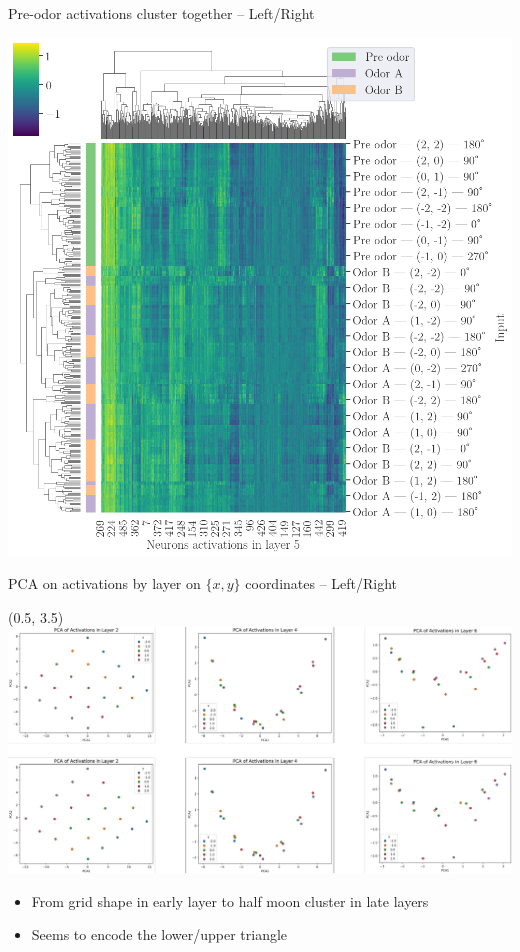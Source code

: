 \documentclass[bigger]{beamer}
\begin{document}
\begin{frame}[label={sec:org95631fe}]{Pre-odor activations cluster together -- Left/Right}
\begin{center}
\includegraphics[height=0.9\textheight]{medias/activations-learned-LeftRight.png}
\end{center}
\end{frame}
\begin{frame}[label={sec:org9a95a04}]{PCA on activations by layer on \(\{x, y\}\) coordinates -- Left/Right}
\begin{textblock}{15}(0.5, 3.5)%
\includegraphics[height=0.7\textheight, keepaspectratio]{medias/PCA-layers-activations-coords-LeftRight.png}
\vspace{-2em}
\footnotesize
\begin{itemize}
\setlength\itemsep{0em}
\item From grid shape in early layer to half moon cluster in late layers
\item Seems to encode the lower/upper triangle
\end{itemize}
\end{textblock}
\end{frame}
\end{document}
